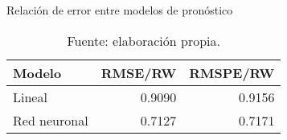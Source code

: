 
\begin{table}[htbp]
	\centering
	\caption{Relación de error entre modelos de pronóstico}
	\begin{tabular}{lrr}
		\toprule
		\textbf{Modelo} & \textbf{RMSE/RW} & \textbf{RMSPE/RW} \\
		\midrule
		Lineal & 0.9090 & 0.9156 \\
		Red neuronal & 0.7127 & 0.7171 \\
		\bottomrule
	\end{tabular}%
	\label{tab:ratioError}%
	\caption*{Fuente: elaboración propia.}
\end{table}
